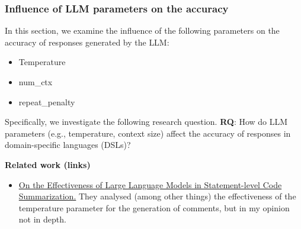 \subsubsection{Influence of LLM parameters on the accuracy}
In this section, we examine the influence of the following parameters on the accuracy of responses generated by the LLM:

\begin{itemize}
    \item Temperature
    \item num\_ctx
    \item repeat\_penalty
\end{itemize}

Specifically, we investigate the following research question.
\textbf{RQ}: How do LLM parameters (e.g., temperature, context size) affect the accuracy of responses in domain-specific languages (DSLs)?

\textbf{Related work (links)}
\begin{itemize}
    \item \href{https://ieeexplore.ieee.org/document/10684656}{On the Effectiveness of Large Language Models in Statement-level Code Summarization.} They analysed (among other things) the effectiveness of the temperature parameter for the generation of comments, but in my opinion not in depth.
\end{itemize}
